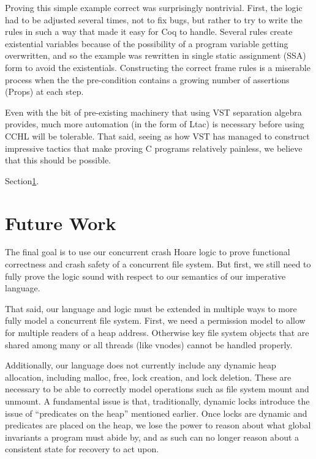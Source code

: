 Proving this simple example correct was surprisingly nontrivial. First, the
logic had to be adjusted several times, not to fix bugs, but rather to try to
write the rules in such a way that made it easy for Coq to handle. Several rules
create existential variables because of the possibility of a program variable
getting overwritten, and so the example was rewritten in single static
assignment (SSA) form to avoid the existentials. Constructing the correct frame
rules is a miserable process when the the pre-condition contains a growing
number of assertions (Props) at each step.

Even with the bit of pre-existing machinery that using VST separation algebra
provides, much more automation (in the form of Ltac) is necessary before using
CCHL will be tolerable. That said, seeing as how VST has managed to construct
impressive tactics that make proving C programs relatively painless, we believe
that this should be possible.

Section\ref{sec:future}.


\section{Future Work}
\label{sec:future}


The final goal is to use our concurrent crash Hoare logic to prove
functional correctness and crash safety
of a concurrent file system.
But first,
we still need to fully prove the logic sound with respect to our
semantics of our imperative language.

That said, our language and logic must be extended in multiple ways to more
fully model a concurrent file system.
First, we need a
permission model to allow for multiple readers of a heap address.
Otherwise key file system objects that are shared among many or all
threads (like vnodes) cannot be handled properly.

Additionally, our language does not currently include any dynamic heap
allocation, including malloc, free, lock creation, and lock deletion.
These are
necessary to be able to correctly model operations such as file system mount and
unmount.
A fundamental issue is that, traditionally, dynamic locks introduce the
issue of ``predicates on the heap'' mentioned earlier.
Once locks are dynamic and
predicates are placed on the heap, we lose the power to reason about what global
invariants a program must abide by, and as such can no longer reason about a
consistent state for recovery to act upon.

